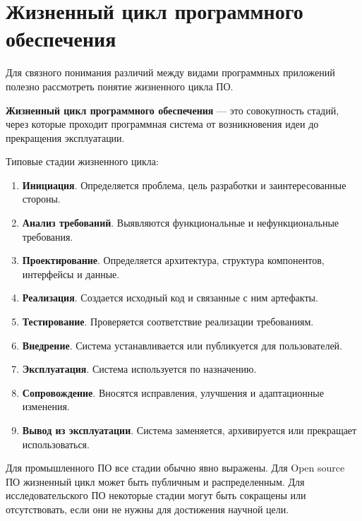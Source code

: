 \documentclass[12pt,a4paper]{article}
\begin{document}
\section{Жизненный цикл программного обеспечения}

Для связного понимания различий между видами программных приложений полезно рассмотреть понятие жизненного цикла ПО.

\textbf{Жизненный цикл программного обеспечения} --- это совокупность стадий, через которые проходит программная система от возникновения идеи до прекращения эксплуатации.

Типовые стадии жизненного цикла:

\begin{enumerate}
    \item \textbf{Инициация}. Определяется проблема, цель разработки и заинтересованные стороны.

    \item \textbf{Анализ требований}. Выявляются функциональные и нефункциональные требования.

    \item \textbf{Проектирование}. Определяется архитектура, структура компонентов, интерфейсы и данные.

    \item \textbf{Реализация}. Создается исходный код и связанные с ним артефакты.

    \item \textbf{Тестирование}. Проверяется соответствие реализации требованиям.

    \item \textbf{Внедрение}. Система устанавливается или публикуется для пользователей.

    \item \textbf{Эксплуатация}. Система используется по назначению.

    \item \textbf{Сопровождение}. Вносятся исправления, улучшения и адаптационные изменения.

    \item \textbf{Вывод из эксплуатации}. Система заменяется, архивируется или прекращает использоваться.
\end{enumerate}

Для промышленного ПО все стадии обычно явно выражены. Для Open source ПО жизненный цикл может быть публичным и распределенным. Для исследовательского ПО некоторые стадии могут быть сокращены или отсутствовать, если они не нужны для достижения научной цели.
\end{document}
